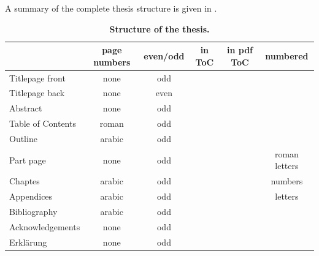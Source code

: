 A summary of the complete thesis structure is given in .

\begin{table}
	\centering 
	\caption{\textbf{Structure of the thesis.}}
	\label{tab:thesistructure}
	\vspace{5ex}
	\begin{tabular}{lccccc} 
		\toprule
		 & page numbers & even/odd & in ToC & in pdf ToC & numbered  \\ 
		\midrule 
		Titlepage front  & none & odd & \color{bqred}\XSolidBrush& \color{bqgreen} \CheckmarkBold &\color{bqred} \XSolidBrush\\
		Titlepage back & none & even & \color{bqred}\XSolidBrush& \color{bqred}\XSolidBrush& \color{bqred}\XSolidBrush\\
		Abstract & none & odd & \color{bqred}\XSolidBrush& \color{bqgreen}\CheckmarkBold & \color{bqred}\XSolidBrush\\
		Table of Contents & roman & odd & \color{bqred}\XSolidBrush& \color{bqgreen}\CheckmarkBold &\color{bqred} \XSolidBrush\\
		Outline & arabic & odd &\color{bqgreen} \CheckmarkBold &\color{bqgreen} \CheckmarkBold & \color{bqred}\XSolidBrush\\
		Part page & none & odd & \color{bqgreen}\CheckmarkBold & \color{bqgreen}\CheckmarkBold & roman letters\\
		Chaptes & arabic & odd & \color{bqgreen}\CheckmarkBold &\color{bqgreen} \CheckmarkBold & numbers\\
		Appendices & arabic & odd & \color{bqgreen}\CheckmarkBold &\color{bqgreen} \CheckmarkBold & letters\\
		Bibliography & arabic & odd & \color{bqgreen}\CheckmarkBold & \color{bqgreen}\CheckmarkBold & \color{bqred}\XSolidBrush\\
		Acknowledgements & none & odd & \color{bqred}\XSolidBrush& \color{bqgreen}\CheckmarkBold & \color{bqred}\XSolidBrush\\
		Erklärung & none & odd & \color{bqred}\XSolidBrush&\color{bqgreen} \CheckmarkBold & \color{bqred}\XSolidBrush\\
		\bottomrule
	\end{tabular}
\end{table}

